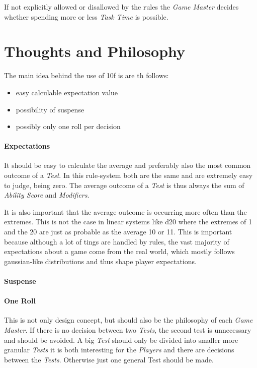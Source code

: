 If not explicitly allowed or disallowed by the rules the \emph{Game Master}
decides whether spending more or less \emph{Task Time} is possible.

\section{Thoughts and Philosophy}

The main idea behind the use of 10f is are th follows:

\begin{itemize}[parsep=0em]
    \item easy calculable expectation value
    \item possibility of suspense
    \item possibly only one roll per decision
\end{itemize}


\paragraph{Expectations}
It should be easy to calculate the average and preferably also the most common
outcome of a \emph{Test}. In this rule-system both are the same and are extremely
easy to judge, being zero. The average outcome of a \emph{Test} is thus always
the sum of \emph{Ability Score} and \emph{Modifiers}.

It is also important that the average outcome is occurring more often than the
extremes. This is not the case in linear systems like d20 where the extremes of
1 and the 20 are just as probable as the average 10 or 11.
This is important because although a lot of tings are handled by rules,
the vast majority of expectations about a game come from the real world,
which mostly follows gaussian-like distributions and thus shape player expectations.

\paragraph{Suspense}

\paragraph{One Roll}
This is not only design concept, but should also be the philosophy of each
\emph{Game Master}. If there is no decision between two \emph{Tests}, the second
test is unnecessary and should be avoided.
A big \emph{Test} should only be divided into smaller more granular \emph{Tests}
it is both
interesting for the \emph{Players} and there are decisions between the \emph{Tests}.
Otherwise just one general Test should be made.